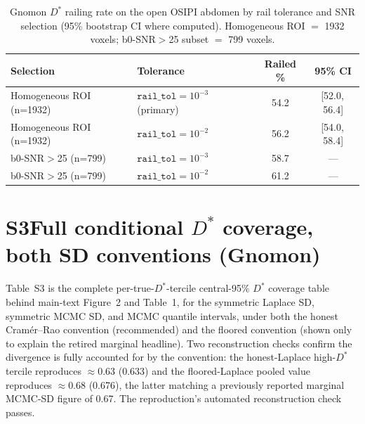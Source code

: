 \documentclass[11pt]{article}
\newcommand{\Dstar}{\ensuremath{D^{*}}}
\begin{document}
\begin{table}[htbp]
\centering
\caption{Gnomon \Dstar{} railing rate on the open OSIPI abdomen by rail tolerance and SNR
selection (95\% bootstrap CI where computed). Homogeneous ROI $=$ 1932 voxels;
b0-SNR$>$25 subset $=$ 799 voxels.}
\small
\begin{tabular}{llcc}
\toprule
Selection & Tolerance & Railed \% & 95\% CI \\
\midrule
Homogeneous ROI (n=1932) & $\texttt{rail\_tol}=10^{-3}$ (primary) & 54.2 & [52.0,\,56.4] \\
Homogeneous ROI (n=1932) & $\texttt{rail\_tol}=10^{-2}$ & 56.2 & [54.0,\,58.4] \\
b0-SNR$>$25 (n=799) & $\texttt{rail\_tol}=10^{-3}$ & 58.7 & --- \\
b0-SNR$>$25 (n=799) & $\texttt{rail\_tol}=10^{-2}$ & 61.2 & --- \\
\bottomrule
\end{tabular}
\end{table}

\section*{S3\quad Full conditional \Dstar{} coverage, both SD conventions (Gnomon)}

Table~S3 is the complete per-true-\Dstar{}-tercile central-95\% \Dstar{} coverage table
behind main-text Figure~2 and Table~1, for the symmetric Laplace SD, symmetric MCMC SD,
and MCMC quantile intervals, under both the honest Cram\'er--Rao convention (recommended)
and the floored convention (shown only to explain the retired marginal headline). Two
reconstruction checks confirm the divergence is fully accounted for by the convention:
the honest-Laplace high-\Dstar{} tercile reproduces $\approx$0.63 (0.633) and the
floored-Laplace pooled value reproduces $\approx$0.68 (0.676), the latter matching a
previously reported marginal MCMC-SD figure of 0.67. The reproduction's automated
reconstruction check passes.
\end{document}
